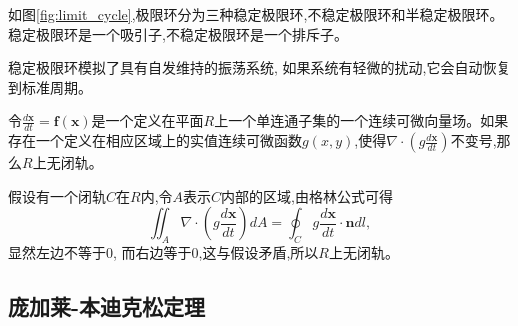 如图\ref{fig:limit_cycle},极限环分为三种稳定极限环,不稳定极限环和半稳定极限环。稳定极限环是一个吸引子,不稳定极限环是一个排斥子。

稳定极限环模拟了具有自发维持的振荡系统, 如果系统有轻微的扰动,它会自动恢复到标准周期。

\begin{thm}[Dulac准则]
    令$\frac{d\mathbf{x}}{dt}=\mathbf{f}(\mathbf{x})$是一个定义在平面$R$上一个单连通子集的一个连续可微向量场。如果存在一个定义在相应区域上的实值连续可微函数$g(x, y)$,使得$\nabla \cdot (g \frac{d\mathbf{x}}{dt})$不变号,那么$R$上无闭轨。
\end{thm}
\begin{pf}
    假设有一个闭轨$C$在$R$内,令$A$表示$C$内部的区域,由格林公式可得
    \begin{equation}
        \iint_A \nabla \cdot(g \frac{d\mathbf{x}}{dt})dA=\oint_C g \frac{d\mathbf{x}}{dt}\cdot \mathbf{n}dl,
    \end{equation}
    显然左边不等于0, 而右边等于0,这与假设矛盾,所以$R$上无闭轨。
\end{pf}

\subsection{庞加莱-本迪克松定理}

